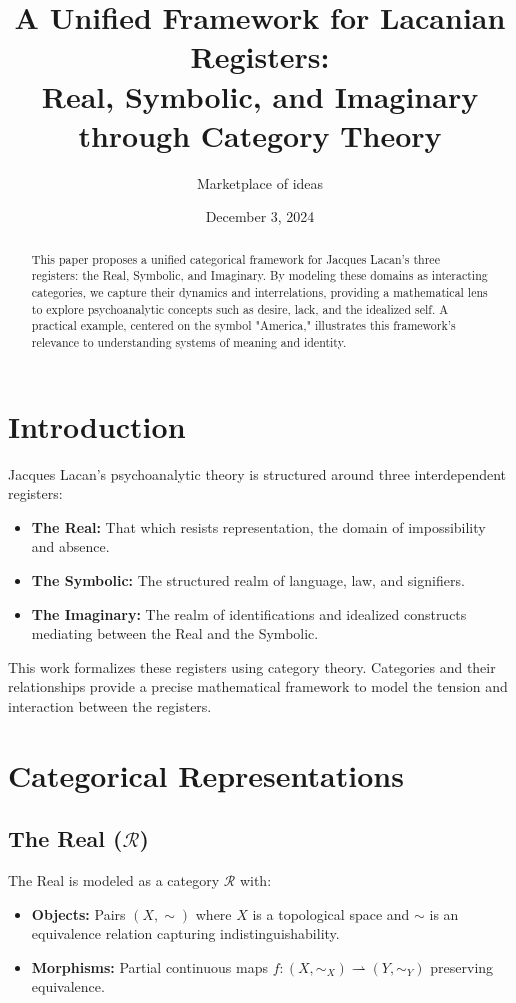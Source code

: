 \documentclass{article}
\title{A Unified Framework for Lacanian Registers: \\
Real, Symbolic, and Imaginary through Category Theory}
\author{Marketplace of ideas}
\date{December 3, 2024}
\begin{document}
\maketitle

\begin{abstract}
This paper proposes a unified categorical framework for Jacques Lacan's three registers: the Real, Symbolic, and Imaginary. By modeling these domains as interacting categories, we capture their dynamics and interrelations, providing a mathematical lens to explore psychoanalytic concepts such as desire, lack, and the idealized self. A practical example, centered on the symbol "America," illustrates this framework's relevance to understanding systems of meaning and identity.
\end{abstract}

\section{Introduction}

Jacques Lacan’s psychoanalytic theory is structured around three interdependent registers:
\begin{itemize}
    \item \textbf{The Real:} That which resists representation, the domain of impossibility and absence.
    \item \textbf{The Symbolic:} The structured realm of language, law, and signifiers.
    \item \textbf{The Imaginary:} The realm of identifications and idealized constructs mediating between the Real and the Symbolic.
\end{itemize}

This work formalizes these registers using category theory. Categories and their relationships provide a precise mathematical framework to model the tension and interaction between the registers.

\section{Categorical Representations}

\subsection{The Real ($\mathscr{R}$)}
The Real is modeled as a category $\mathscr{R}$ with:
\begin{itemize}
    \item \textbf{Objects:} Pairs $(X, \sim)$ where $X$ is a topological space and $\sim$ is an equivalence relation capturing indistinguishability.
    \item \textbf{Morphisms:} Partial continuous maps $f: (X, \sim_X) \rightharpoonup (Y, \sim_Y)$ preserving equivalence.
\end{itemize}
\end{document}

